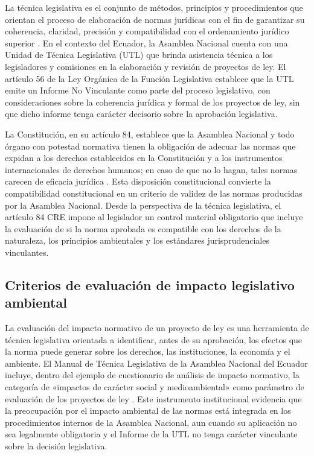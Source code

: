La técnica legislativa es el conjunto de métodos, principios y procedimientos que orientan el proceso de elaboración de normas jurídicas con el fin de garantizar su coherencia, claridad, precisión y compatibilidad con el ordenamiento jurídico superior \parencite{manual_tecnica_legislativa_an}. En el contexto del Ecuador, la Asamblea Nacional cuenta con una Unidad de Técnica Legislativa (UTL) que brinda asistencia técnica a los legisladores y comisiones en la elaboración y revisión de proyectos de ley. El artículo 56 de la Ley Orgánica de la Función Legislativa establece que la UTL emite un Informe No Vinculante como parte del proceso legislativo, con consideraciones sobre la coherencia jurídica y formal de los proyectos de ley, sin que dicho informe tenga carácter decisorio sobre la aprobación legislativa.

La Constitución, en su artículo 84, establece que la Asamblea Nacional y todo órgano con potestad normativa tienen la obligación de adecuar las normas que expidan a los derechos establecidos en la Constitución y a los instrumentos internacionales de derechos humanos; en caso de que no lo hagan, tales normas carecen de eficacia jurídica \parencite{cre_2008}. Esta disposición constitucional convierte la compatibilidad constitucional en un criterio de validez de las normas producidas por la Asamblea Nacional. Desde la perspectiva de la técnica legislativa, el artículo 84 CRE impone al legislador un control material obligatorio que incluye la evaluación de si la norma aprobada es compatible con los derechos de la naturaleza, los principios ambientales y los estándares jurisprudenciales vinculantes.

\subsection{Criterios de evaluación de impacto legislativo ambiental}

La evaluación del impacto normativo de un proyecto de ley es una herramienta de técnica legislativa orientada a identificar, antes de su aprobación, los efectos que la norma puede generar sobre los derechos, las instituciones, la economía y el ambiente. El Manual de Técnica Legislativa de la Asamblea Nacional del Ecuador incluye, dentro del ejemplo de cuestionario de análisis de impacto normativo, la categoría de «impactos de carácter social y medioambiental» como parámetro de evaluación de los proyectos de ley \parencite{manual_tecnica_legislativa_an}. Este instrumento institucional evidencia que la preocupación por el impacto ambiental de las normas está integrada en los procedimientos internos de la Asamblea Nacional, aun cuando su aplicación no sea legalmente obligatoria y el Informe de la UTL no tenga carácter vinculante sobre la decisión legislativa.

